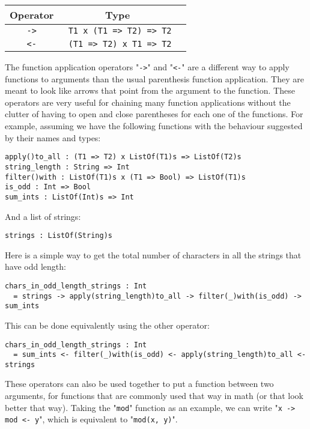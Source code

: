 \documentclass{article}
\begin{document}
\begin{center}
\begin{tabular}{ |c|c|c| } 
\hline
Operator & Type
\\ 
\hline
\hline
\verb|->| & \verb| T1 x (T1 => T2) => T2|
\\
\hline
\verb|<-| & \verb| (T1 => T2) x T1 => T2|
\\
\hline
\end{tabular}
\end{center}
The function application operators "\verb|->|" and "\verb|<-|" are a
different way to apply functions to arguments than the usual parenthesis
function application.  They are meant to look like arrows that point from the
argument to the function.  These operators are very useful for chaining many
function applications without the clutter of having to open and close
parentheses for each one of the functions.  For example, assuming we have the
following functions with the behaviour suggested by their names and types:
\begin{verbatim}
apply()to_all : (T1 => T2) x ListOf(T1)s => ListOf(T2)s
string_length : String => Int
filter()with : ListOf(T1)s x (T1 => Bool) => ListOf(T1)s
is_odd : Int => Bool
sum_ints : ListOf(Int)s => Int
\end{verbatim}
And a list of strings:
\begin{verbatim}
strings : ListOf(String)s
\end{verbatim}
Here is a simple way to get the total number of characters in all the strings
that have odd length:
\begin{verbatim}
chars_in_odd_length_strings : Int
  = strings -> apply(string_length)to_all -> filter(_)with(is_odd) -> sum_ints
\end{verbatim}
This can be done equivalently using the other operator:
\begin{verbatim}
chars_in_odd_length_strings : Int
  = sum_ints <- filter(_)with(is_odd) <- apply(string_length)to_all <- strings

\end{verbatim}
These operators can also be used together to put a function between two
arguments, for functions that are commonly used that way in math (or that look
better that way). Taking the "\verb|mod|" function as an example, we can 
write "\verb|x -> mod <- y|", which is equivalent to "\verb|mod(x, y)|".

\newpage
\end{document}
